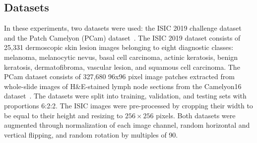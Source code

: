 \subsection{Datasets}
In these experiments, two datasets were used: the ISIC 2019 challenge dataset~\cite{codella2018skin,combalia2019bcn20000,tschandl2018ham10000} and the Patch Camelyon (PCam) dataset~\cite{veeling2018rotation}. The ISIC 2019 dataset consists of 25,331 dermoscopic skin lesion images belonging to eight diagnostic classes: melanoma, melanocytic nevus, basal cell carcinoma, actinic keratosis, benign keratosis, dermatofibroma, vascular lesion, and squamous cell carcinoma. The PCam dataset consists of 327,680 96x96 pixel image patches extracted from whole-slide images of H\&E-stained lymph node sections from the Camelyon16 dataset~\cite{bejnordi2017diagnostic}. The datasets were split into training, validation, and testing sets with proportions 6:2:2. The ISIC images were pre-processed by cropping their width to be equal to their height and resizing to $256 \times 256$ pixels. Both datasets were augmented through normalization of each image channel, random horizontal and vertical flipping, and random rotation by multiples of 90\textdegree.


